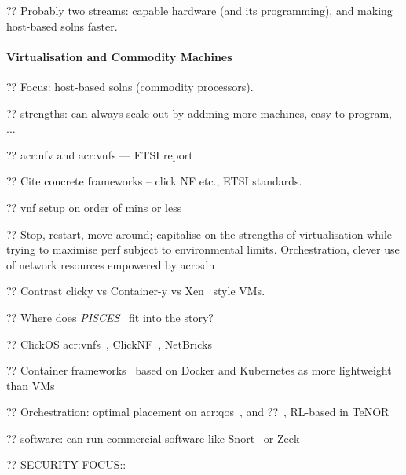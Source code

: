 ?? Probably two streams: capable hardware (and its programming), and making host-based solns faster.

\paragraph{Virtualisation and Commodity Machines}

?? Focus: host-based solns (commodity processors).

?? strengths: can always scale out by addming more machines, easy to program, ...

?? \gls{acr:nfv} and \glspl{acr:vnf} --- ETSI report~\parencite{etsi-nfv}

?? Cite concrete frameworks -- click NF etc., ETSI standards.

?? vnf setup on order of mins or less~\parencite{DBLP:conf/nsdi/MartinsAROHBH14,DBLP:conf/iscc/CzivaJWP15}

?? Stop, restart, move around; capitalise on the strengths of virtualisation while trying to maximise perf subject to environmental limits. Orchestration, clever use of network resources empowered by \gls{acr:sdn}

?? Contrast clicky vs Container-y vs Xen~\parencite{DBLP:conf/sosp/BarhamDFHHHN03} style VMs.

?? Where does \emph{PISCES}~\parencite{DBLP:conf/sigcomm/ShahbazCPKFMR16} fit into the story?

?? ClickOS \glspl{acr:vnf}~\parencite{DBLP:conf/nsdi/MartinsAROHBH14}, ClickNF~\parencite{DBLP:conf/usenix/GalloL18}, NetBricks~\parencite{DBLP:conf/osdi/PandaHJWRS16}

?? Container frameworks~\parencite{DBLP:conf/iscc/CzivaJWP15,DBLP:journals/cm/CzivaP17} based on Docker and Kubernetes as more lightweight than VMs~\parencite{k8s}

?? Orchestration: optimal placement on \gls{acr:qos}~\parencite{DBLP:conf/im/Iordache-SicaAP21}, and ??~\parencite{DBLP:conf/infocom/CzivaAP18}, RL-based in TeNOR~\parencite{DBLP:conf/netsoft/RieraBBDMPLGPCP16}

?? software: can run commercial software like Snort~\parencite{DBLP:conf/lisa/Roesch99,SnortManual} or Zeek~\parencite{zeek,DBLP:conf/uss/Paxson98}

?? SECURITY FOCUS::

